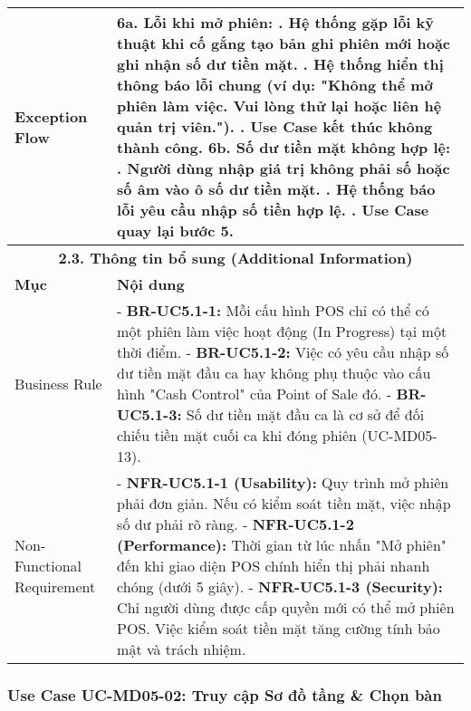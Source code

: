 \begin{longtable}{|m{4cm}|p{11cm}|}
\hline
Exception Flow & \textbf{6a. Lỗi khi mở phiên:} \newline    1. Hệ thống gặp lỗi kỹ thuật khi cố gắng tạo bản ghi phiên mới hoặc ghi nhận số dư tiền mặt. \newline    2. Hệ thống hiển thị thông báo lỗi chung (ví dụ: "Không thể mở phiên làm việc. Vui lòng thử lại hoặc liên hệ quản trị viên."). \newline    3. Use Case kết thúc không thành công. \newline \textbf{6b. Số dư tiền mặt không hợp lệ:} \newline    1. Người dùng nhập giá trị không phải số hoặc số âm vào ô số dư tiền mặt. \newline    2. Hệ thống báo lỗi yêu cầu nhập số tiền hợp lệ. \newline    3. Use Case quay lại bước 5. \\
\hline
\multicolumn{2}{|c|}{\textbf{2.3. Thông tin bổ sung (Additional Information)}} \\
\hline
\textbf{Mục} & \textbf{Nội dung} \\
\hline
Business Rule & - \textbf{BR-UC5.1-1:} Mỗi cấu hình POS chỉ có thể có một phiên làm việc hoạt động (In Progress) tại một thời điểm. \newline - \textbf{BR-UC5.1-2:} Việc có yêu cầu nhập số dư tiền mặt đầu ca hay không phụ thuộc vào cấu hình "Cash Control" của Point of Sale đó. \newline - \textbf{BR-UC5.1-3:} Số dư tiền mặt đầu ca là cơ sở để đối chiếu tiền mặt cuối ca khi đóng phiên (UC-MD05-13). \\
\hline
Non-Functional Requirement & - \textbf{NFR-UC5.1-1 (Usability):} Quy trình mở phiên phải đơn giản. Nếu có kiểm soát tiền mặt, việc nhập số dư phải rõ ràng. \newline - \textbf{NFR-UC5.1-2 (Performance):} Thời gian từ lúc nhấn "Mở phiên" đến khi giao diện POS chính hiển thị phải nhanh chóng (dưới 5 giây). \newline - \textbf{NFR-UC5.1-3 (Security):} Chỉ người dùng được cấp quyền mới có thể mở phiên POS. Việc kiểm soát tiền mặt tăng cường tính bảo mật và trách nhiệm. \\
\hline
\end{longtable}

\subsubsection{Use Case UC-MD05-02: Truy cập Sơ đồ tầng \& Chọn bàn}

